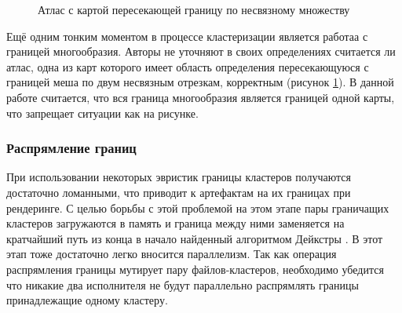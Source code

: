 \documentclass[12pt]{extarticle}
\begin{document}
\begin{figure}[ht]
\centering
{}
\caption{Атлас с картой пересекающей границу по несвязному множеству}
\label{fig:weird_edge}
\end{figure}
Ещё одним тонким моментом в процессе кластеризации является работаа с границей многообразия. Авторы \cite{purnomo2004} не уточняют в своих определениях считается ли атлас, одна из карт которого имеет область определения пересекающуюся с границей меша по двум несвязным отрезкам, корректным (рисунок \ref{fig:weird_edge}). В данной работе считается, что вся граница многообразия является границей одной карты, что запрещает ситуации как на рисунке.

\subsubsection{Распрямление границ}
При использовании некоторых эвристик границы кластеров получаются достаточно ломанными, что приводит к артефактам на их границах при рендеринге. С целью борьбы с этой проблемой на этом этапе пары граничащих кластеров загружаются в память и граница между ними заменяется на кратчайший путь из конца в начало найденный алгоритмом Дейкстры \cite{dijkstra}. В этот этап тоже достаточно легко вносится параллелизм. Так как операция распрямления границы мутирует пару файлов-кластеров, необходимо убедится что никакие два исполнителя не будут параллельно распрямлять границы принадлежащие одному кластеру.
\end{document}

